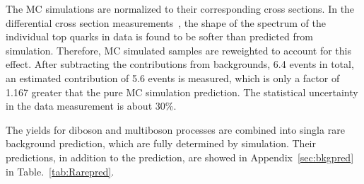 The MC simulations are normalized to their corresponding cross sections. 
%
In the differential \ttbar cross section measurements~\cite{CMS-PAS-TOP-12-027,CMS-PAS-TOP-12-028}, the shape of the \pt spectrum of the individual top quarks in data is found to be softer than predicted from simulation. 
%
Therefore, \ttbar MC simulated samples are reweighted to account for this effect.  
%
After subtracting the contributions from backgrounds, 6.4 events in total, an estimated \ttbarZ contribution of 5.6 events is measured, which is only a factor of 1.167 greater that the pure MC simulation prediction. 
%
The statistical uncertainty in the data measurement is about 30\%. 

The yields for diboson and multiboson processes are combined into singla rare background prediction, which are fully determined by simulation. 
%
Their predictions, in addition to the \ttbarZ prediction, are showed in Appendix~\ref{sec:bkgpred} in Table.~\ref{tab:Rarepred}.

